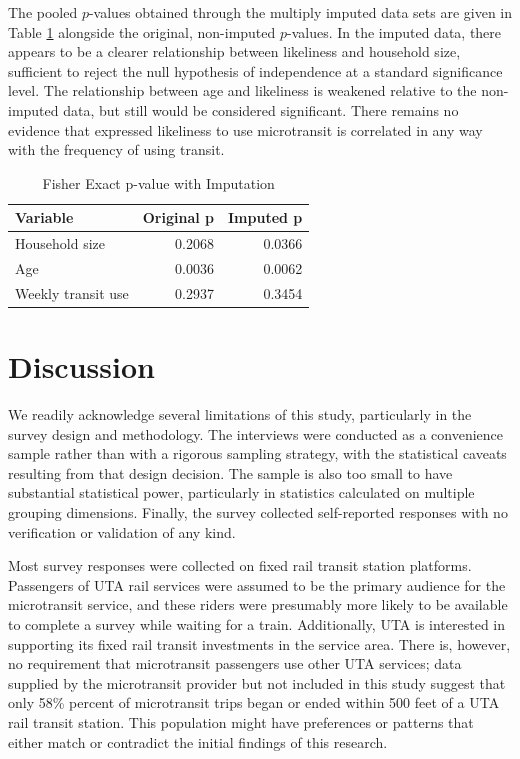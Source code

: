 \documentclass[smartcities,article,submit,moreauthors,pdftex]{mdpi}
\begin{document}
The pooled \(p\)-values obtained through the multiply imputed data sets are given
in Table \ref{tab:mi-fishers-table} alongside the original, non-imputed
\(p\)-values. In the imputed data, there appears to be a clearer relationship
between likeliness and household size, sufficient to reject the null hypothesis
of independence at a standard significance level. The relationship between age
and likeliness is weakened relative to the non-imputed data, but still would be
considered significant. There remains no evidence that expressed likeliness to
use microtransit is correlated in any way with the frequency of using transit.

\begin{table}

\caption{\label{tab:mi-fishers-table}Fisher Exact p-value with Imputation}
\centering
\begin{tabular}[t]{lrr}
\toprule
Variable & Original p & Imputed p\\
\midrule
Household size & 0.2068 & 0.0366\\
Age & 0.0036 & 0.0062\\
Weekly transit use & 0.2937 & 0.3454\\
\bottomrule
\end{tabular}
\end{table}

\hypertarget{discussion}{%
\section{Discussion}\label{discussion}}

We readily acknowledge several limitations of this study, particularly in the
survey design and methodology. The interviews were conducted as a convenience
sample rather than with a rigorous sampling strategy, with the statistical
caveats resulting from that design decision. The sample is also too small to
have substantial statistical power, particularly in statistics calculated on
multiple grouping dimensions. Finally, the survey collected self-reported
responses with no verification or validation of any kind.

Most survey responses were collected on fixed rail transit station platforms.
Passengers of UTA rail services were assumed to be the primary audience for
the microtransit service, and these riders were presumably more likely to be
available to complete a survey while waiting for a train.
Additionally, UTA is interested in supporting its fixed rail transit investments
in the service area. There is, however, no requirement that microtransit
passengers use other UTA services; data supplied by the microtransit provider
but not included in this study suggest that only 58\% percent of microtransit
trips began or ended within 500 feet of a UTA rail transit station. This
population might have preferences or patterns that either match or contradict
the initial findings of this research.
\end{document}
